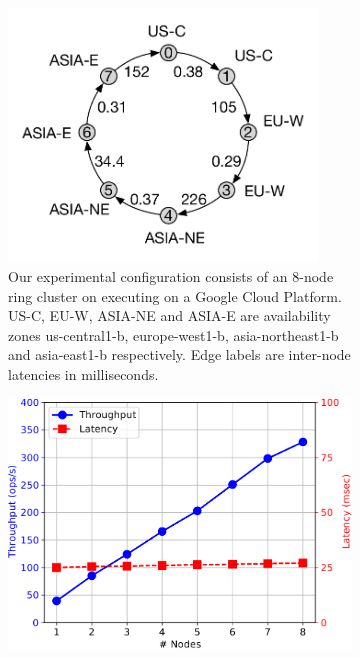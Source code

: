 \begin{figure}[t]
  \centering
	\begin{subfigure}{0.45\textwidth}
		\includegraphics[width=0.9\textwidth]{Figures/cluster.pdf}
		\caption{Our experimental configuration consists of an
                  8-node ring cluster on executing on a Google Cloud
                  Platform. US-C, EU-W, ASIA-NE and ASIA-E are
                  availability zones us-central1-b, europe-west1-b,
                  asia-northeast1-b and asia-east1-b
                  respectively. Edge labels are inter-node latencies
                  in milliseconds.}
		\label{fig:cluster}
	\end{subfigure}
	\hfill
	\begin{subfigure}{0.45\textwidth}
		\includegraphics[width=\textwidth]{Graphs/scalability.pdf}

\end{subfigure}
\end{figure}

